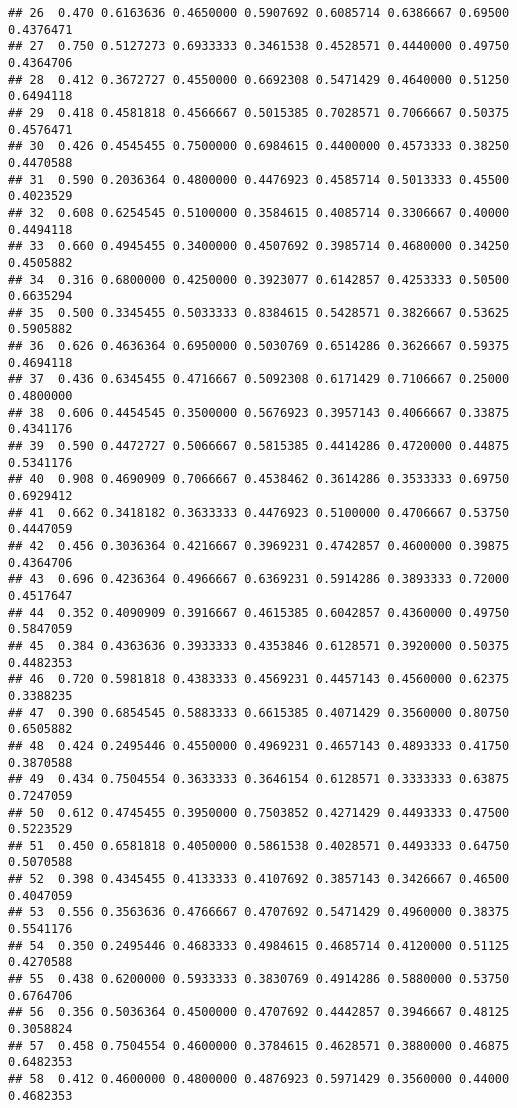 \documentclass[
]{article}
\begin{document}
\begin{verbatim}
## 26  0.470 0.6163636 0.4650000 0.5907692 0.6085714 0.6386667 0.69500 0.4376471
## 27  0.750 0.5127273 0.6933333 0.3461538 0.4528571 0.4440000 0.49750 0.4364706
## 28  0.412 0.3672727 0.4550000 0.6692308 0.5471429 0.4640000 0.51250 0.6494118
## 29  0.418 0.4581818 0.4566667 0.5015385 0.7028571 0.7066667 0.50375 0.4576471
## 30  0.426 0.4545455 0.7500000 0.6984615 0.4400000 0.4573333 0.38250 0.4470588
## 31  0.590 0.2036364 0.4800000 0.4476923 0.4585714 0.5013333 0.45500 0.4023529
## 32  0.608 0.6254545 0.5100000 0.3584615 0.4085714 0.3306667 0.40000 0.4494118
## 33  0.660 0.4945455 0.3400000 0.4507692 0.3985714 0.4680000 0.34250 0.4505882
## 34  0.316 0.6800000 0.4250000 0.3923077 0.6142857 0.4253333 0.50500 0.6635294
## 35  0.500 0.3345455 0.5033333 0.8384615 0.5428571 0.3826667 0.53625 0.5905882
## 36  0.626 0.4636364 0.6950000 0.5030769 0.6514286 0.3626667 0.59375 0.4694118
## 37  0.436 0.6345455 0.4716667 0.5092308 0.6171429 0.7106667 0.25000 0.4800000
## 38  0.606 0.4454545 0.3500000 0.5676923 0.3957143 0.4066667 0.33875 0.4341176
## 39  0.590 0.4472727 0.5066667 0.5815385 0.4414286 0.4720000 0.44875 0.5341176
## 40  0.908 0.4690909 0.7066667 0.4538462 0.3614286 0.3533333 0.69750 0.6929412
## 41  0.662 0.3418182 0.3633333 0.4476923 0.5100000 0.4706667 0.53750 0.4447059
## 42  0.456 0.3036364 0.4216667 0.3969231 0.4742857 0.4600000 0.39875 0.4364706
## 43  0.696 0.4236364 0.4966667 0.6369231 0.5914286 0.3893333 0.72000 0.4517647
## 44  0.352 0.4090909 0.3916667 0.4615385 0.6042857 0.4360000 0.49750 0.5847059
## 45  0.384 0.4363636 0.3933333 0.4353846 0.6128571 0.3920000 0.50375 0.4482353
## 46  0.720 0.5981818 0.4383333 0.4569231 0.4457143 0.4560000 0.62375 0.3388235
## 47  0.390 0.6854545 0.5883333 0.6615385 0.4071429 0.3560000 0.80750 0.6505882
## 48  0.424 0.2495446 0.4550000 0.4969231 0.4657143 0.4893333 0.41750 0.3870588
## 49  0.434 0.7504554 0.3633333 0.3646154 0.6128571 0.3333333 0.63875 0.7247059
## 50  0.612 0.4745455 0.3950000 0.7503852 0.4271429 0.4493333 0.47500 0.5223529
## 51  0.450 0.6581818 0.4050000 0.5861538 0.4028571 0.4493333 0.64750 0.5070588
## 52  0.398 0.4345455 0.4133333 0.4107692 0.3857143 0.3426667 0.46500 0.4047059
## 53  0.556 0.3563636 0.4766667 0.4707692 0.5471429 0.4960000 0.38375 0.5541176
## 54  0.350 0.2495446 0.4683333 0.4984615 0.4685714 0.4120000 0.51125 0.4270588
## 55  0.438 0.6200000 0.5933333 0.3830769 0.4914286 0.5880000 0.53750 0.6764706
## 56  0.356 0.5036364 0.4500000 0.4707692 0.4442857 0.3946667 0.48125 0.3058824
## 57  0.458 0.7504554 0.4600000 0.3784615 0.4628571 0.3880000 0.46875 0.6482353
## 58  0.412 0.4600000 0.4800000 0.4876923 0.5971429 0.3560000 0.44000 0.4682353

\end{verbatim}
\end{document}
